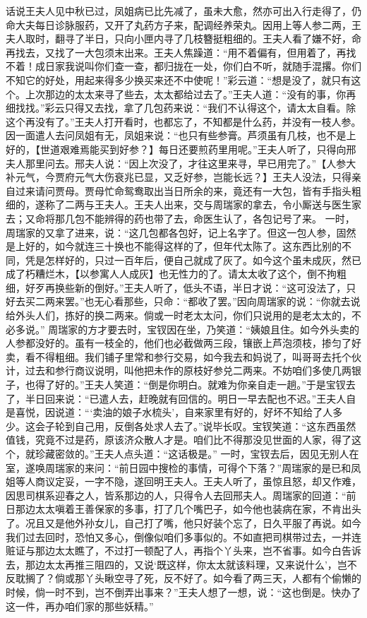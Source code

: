\documentclass[12pt,oneside]{book}
\begin{document}
话说王夫人见中秋已过，凤姐病已比先减了，虽未大愈，然亦可出入行走得了，仍命大夫每日诊脉服药，又开了丸药方子来，配调经养荣丸。因用上等人参二两，王夫人取时，翻寻了半日，只向小匣内寻了几枝簪挺粗细的。王夫人看了嫌不好，命再找去，又找了一大包须末出来。王夫人焦躁道：“用不着偏有，但用着了，再找不着！成日家我说叫你们查一查，都归拢在一处，你们白不听，就随手混撂。你们不知它的好处，用起来得多少换买来还不中使呢！”彩云道：“想是没了，就只有这个。上次那边的太太来寻了些去，太太都给过去了。”王夫人道：“没有的事，你再细找找。”彩云只得又去找，拿了几包药来说：“我们不认得这个，请太太自看。除这个再没有了。”王夫人打开看时，也都忘了，不知都是什么药，并没有一枝人参。因一面遣人去问凤姐有无，凤姐来说：“也只有些参膏。芦须虽有几枝，也不是上好的，【世道艰难焉能买到好参？】每日还要煎药里用呢。”王夫人听了，只得向邢夫人那里问去。邢夫人说：“因上次没了，才往这里来寻，早已用完了。”【人参大补元气，今贾府元气大伤衰兆已显，又乏好参，岂能长远？】王夫人没法，只得亲自过来请问贾母。贾母忙命鸳鸯取出当日所余的来，竟还有一大包，皆有手指头粗细的，遂称了二两与王夫人。王夫人出来，交与周瑞家的拿去，令小厮送与医生家去；又命将那几包不能辨得的药也带了去，命医生认了，各包记号了来。
一时，周瑞家的又拿了进来，说：“这几包都各包好，记上名字了。但这一包人参，固然是上好的，如今就连三十换也不能得这样的了，但年代太陈了。这东西比别的不同，凭是怎样好的，只过一百年后，便自己就成了灰了。如今这个虽未成灰，然已成了朽糟烂木，【以参寓人人成灰】也无性力的了。请太太收了这个，倒不拘粗细，好歹再换些新的倒好。”王夫人听了，低头不语，半日才说：“这可没法了，只好去买二两来罢。”也无心看那些，只命：“都收了罢。”因向周瑞家的说：“你就去说给外头人们，拣好的换二两来。倘或一时老太太问，你们只说用的是老太太的，不必多说。”
周瑞家的方才要去时，宝钗因在坐，乃笑道：“姨娘且住。如今外头卖的人参都没好的。虽有一枝全的，他们也必截做两三段，镶嵌上芦泡须枝，掺匀了好卖，看不得粗细。我们铺子里常和参行交易，如今我去和妈说了，叫哥哥去托个伙计，过去和参行商议说明，叫他把未作的原枝好参兑二两来。不妨咱们多使几两银子，也得了好的。”王夫人笑道：“倒是你明白。就难为你亲自走一趟。”于是宝钗去了，半日回来说：“已遣人去，赶晚就有回信的。明日一早去配也不迟。”王夫人自是喜悦，因说道：“‘卖油的娘子水梳头’，自来家里有好的，好坏不知给了人多少。这会子轮到自己用，反倒各处求人去了。”说毕长叹。宝钗笑道：“这东西虽然值钱，究竟不过是药，原该济众散人才是。咱们比不得那没见世面的人家，得了这个，就珍藏密敛的。”王夫人点头道：“这话极是。”
一时，宝钗去后，因见无别人在室，遂唤周瑞家的来问：“前日园中搜检的事情，可得个下落？”周瑞家的是已和凤姐等人商议定妥，一字不隐，遂回明王夫人。王夫人听了，虽惊且怒，却又作难，因思司棋系迎春之人，皆系那边的人，只得令人去回邢夫人。周瑞家的回道：“前日那边太太嗔着王善保家的多事，打了几个嘴巴子，如今他也装病在家，不肯出头了。况且又是他外孙女儿，自己打了嘴，他只好装个忘了，日久平服了再说。如今我们过去回时，恐怕又多心，倒像似咱们多事似的。不如直把司棋带过去，一并连赃证与那边太太瞧了，不过打一顿配了人，再指个丫头来，岂不省事。如今白告诉去，那边太太再推三阻四的，又说‘既这样，你太太就该料理，又来说什么’，岂不反耽搁了？倘或那丫头瞅空寻了死，反不好了。如今看了两三天，人都有个偷懒的时候，倘一时不到，岂不倒弄出事来？”王夫人想了一想，说：“这也倒是。快办了这一件，再办咱们家的那些妖精。”
\end{document}

